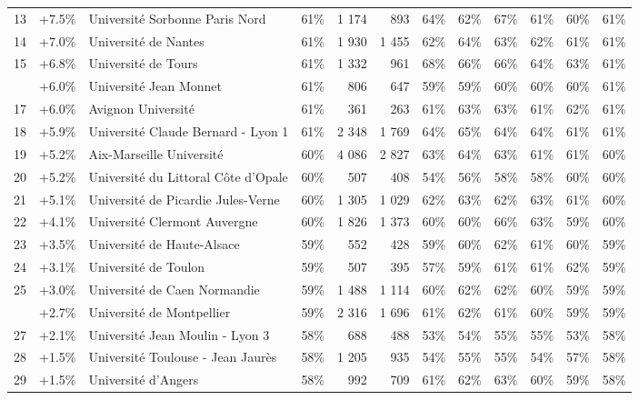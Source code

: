 \documentclass[11pt,french,landscape]{article}
\begin{document}
\begin{longtable}{rrlrrrrrrlrr}
\rowcolor{gray!6}  13 & +7.5\% & Université Sorbonne Paris Nord & 61\% & 1 174 & 893 & 64\% & 62\% & 67\% & 61\% & 60\% & 61\%\\
14 & +7.0\% & Université de Nantes & 61\% & 1 930 & 1 455 & 62\% & 64\% & 63\% & 62\% & 61\% & 61\%\\
\rowcolor{gray!6}  15 & +6.8\% & Université de Tours & 61\% & 1 332 & 961 & 68\% & 66\% & 66\% & 64\% & 63\% & 61\%\\
\addlinespace
16 & +6.0\% & Université Jean Monnet & 61\% & 806 & 647 & 59\% & 59\% & 60\% & 60\% & 60\% & 61\%\\
\rowcolor{gray!6}  17 & +6.0\% & Avignon Université & 61\% & 361 & 263 & 61\% & 63\% & 63\% & 61\% & 62\% & 61\%\\
18 & +5.9\% & Université Claude Bernard - Lyon 1 & 61\% & 2 348 & 1 769 & 64\% & 65\% & 64\% & 64\% & 61\% & 61\%\\
\rowcolor{gray!6}  19 & +5.2\% & Aix-Marseille Université & 60\% & 4 086 & 2 827 & 63\% & 64\% & 63\% & 61\% & 61\% & 60\%\\
20 & +5.2\% & Université du Littoral Côte d'Opale & 60\% & 507 & 408 & 54\% & 56\% & 58\% & 58\% & 60\% & 60\%\\
\addlinespace
\rowcolor{gray!6}  21 & +5.1\% & Université de Picardie Jules-Verne & 60\% & 1 305 & 1 029 & 62\% & 63\% & 62\% & 63\% & 61\% & 60\%\\
22 & +4.1\% & Université Clermont Auvergne & 60\% & 1 826 & 1 373 & 60\% & 60\% & 66\% & 63\% & 59\% & 60\%\\
\rowcolor{gray!6}  23 & +3.5\% & Université de Haute-Alsace & 59\% & 552 & 428 & 59\% & 60\% & 62\% & 61\% & 60\% & 59\%\\
24 & +3.1\% & Université de Toulon & 59\% & 507 & 395 & 57\% & 59\% & 61\% & 61\% & 62\% & 59\%\\
\rowcolor{gray!6}  25 & +3.0\% & Université de Caen Normandie & 59\% & 1 488 & 1 114 & 60\% & 62\% & 62\% & 60\% & 59\% & 59\%\\
\addlinespace
26 & +2.7\% & Université de Montpellier & 59\% & 2 316 & 1 696 & 61\% & 62\% & 61\% & 60\% & 59\% & 59\%\\
\rowcolor{gray!6}  27 & +2.1\% & Université Jean Moulin - Lyon 3 & 58\% & 688 & 488 & 53\% & 54\% & 55\% & 55\% & 53\% & 58\%\\
28 & +1.5\% & Université Toulouse - Jean Jaurès & 58\% & 1 205 & 935 & 54\% & 55\% & 55\% & 54\% & 57\% & 58\%\\
\rowcolor{gray!6}  29 & +1.5\% & Université d'Angers & 58\% & 992 & 709 & 61\% & 62\% & 63\% & 60\% & 59\% & 58\%\\

\end{longtable}
\end{document}
